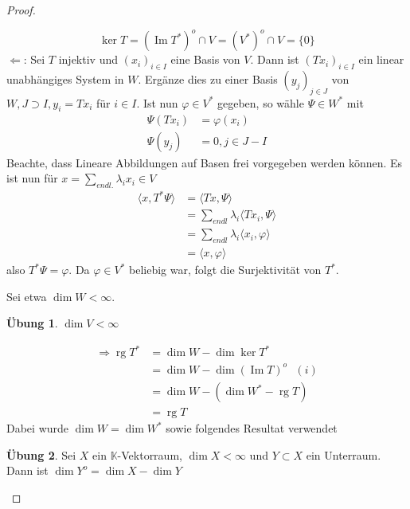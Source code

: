 \documentclass[12pt,a4paper]{article}
\theoremstyle{definition}
\newtheorem*{exercise}{Übung}
\theoremstyle{remark}
\DeclareMathOperator{\Img}{Im}
\DeclareMathOperator{\rg}{rg}
\begin{document}
\begin{proof}
\begin{proofenum}
				\begin{equation}
					\ker T = (\Img T^*)^o \cap V = (V^*)^o \cap V = \{ 0 \} 
				\end{equation}
				$\Leftarrow$: Sei $T$ injektiv und $(x_i)_{i \in I}$ eine Basis von $V$. Dann ist $(Tx_i)_{i \in I}$ ein linear unabhängiges System in $W$. Ergänze dies zu einer Basis $(y_j)_{j \in J}$ von $W, J \supset I, y_i = Tx_i$ für $i \in I$. Ist nun $\varphi \in V^*$ gegeben, so wähle $\Psi \in W^*$ mit
				\begin{equation}
					\begin{split}
						\Psi(Tx_i) &= \varphi (x_i) \\
						\Psi (y_j) &= 0, j \in J - I
					\end{split}
				\end{equation}
				Beachte, dass Lineare Abbildungen auf Basen frei vorgegeben werden können. Es ist nun für $x = \sum_{endl.} \lambda_i x_i \in V$
				\begin{equation}
					\begin{split}
						\langle x, T^* \Psi \rangle &= \langle Tx, \Psi \rangle \\
						&= \sum_{endl} \lambda_i \langle Tx_i, \Psi \rangle \\
						&= \sum_{endl} \lambda_i \langle x_i, \varphi \rangle \\
						&= \langle x, \varphi \rangle
					\end{split}
				\end{equation}
				also $T^* \Psi = \varphi$. Da $\varphi \in V^*$ beliebig war, folgt die Surjektivität von $T^*$.
			\item 
				Sei etwa $\dim W < \infty$. 
				\begin{exercise}
					$\dim V < \infty$
				\end{exercise}
				\begin{equation}
					\begin{split}
						\Rightarrow \rg T^* &= \dim W - \dim \ker T^* \\
						&= \dim W- \dim (\Img T)^o \ \ \ (i) \\
						&= \dim W - (\dim W^* - \rg T) \\
						&= \rg T
					\end{split}
				\end{equation}
				Dabei wurde $\dim W = \dim W^*$ sowie folgendes Resultat verwendet
				\begin{exercise}
					Sei $X$ ein $\mathbb{K}$-Vektorraum, $\dim X < \infty$ und $Y \subset X$ ein Unterraum. Dann ist $\dim Y^o = \dim X - \dim Y$
				\end{exercise}
		\end{proofenum}
	\end{proof}
\end{document}
